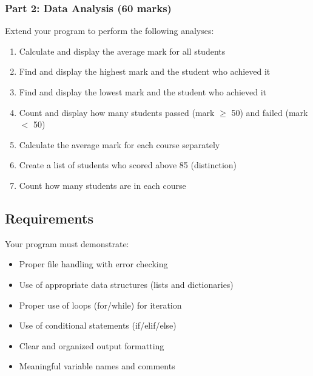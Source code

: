 \documentclass[a4paper,11pt]{article}
\theoremstyle{mytheor}
\begin{document}
\subsubsection*{Part 2: Data Analysis (60 marks)}

Extend your program to perform the following analyses:

\begin{enumerate}
    \item Calculate and display the average mark for all students
    \item Find and display the highest mark and the student who achieved it
    \item Find and display the lowest mark and the student who achieved it
    \item Count and display how many students passed (mark $\geq$ 50) and failed (mark $<$ 50)
    \item Calculate the average mark for each course separately
    \item Create a list of students who scored above 85 (distinction)
    \item Count how many students are in each course
\end{enumerate}

\subsection*{Requirements}

Your program must demonstrate:

\begin{itemize}
    \item Proper file handling with error checking
    \item Use of appropriate data structures (lists and dictionaries)
    \item Proper use of loops (for/while) for iteration
    \item Use of conditional statements (if/elif/else)
    \item Clear and organized output formatting
    \item Meaningful variable names and comments
\end{itemize}
 

\end{document}
